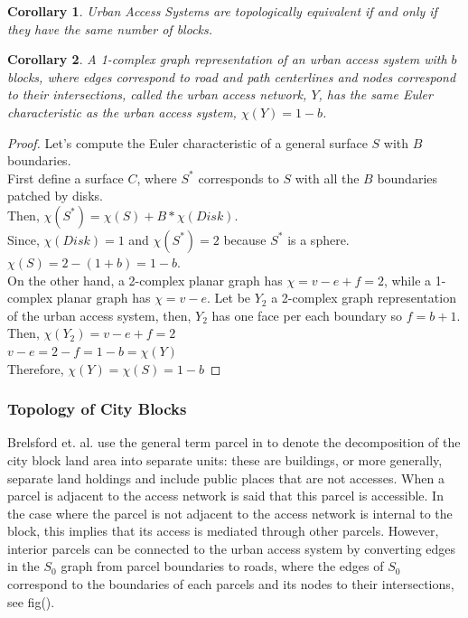\documentclass[10pt]{article}
\newtheorem{corollary}{Corollary}[theorem]
\begin{document}
\begin{corollary}
    Urban Access Systems are topologically equivalent if and only if they have the same number of blocks. 
\end{corollary}

\begin{corollary}
    A 1-complex graph representation of an urban access system with $b$ blocks, where edges correspond to road and path centerlines and nodes correspond to their intersections, called the urban access network, $Y$, has the same Euler characteristic as the urban access system, $\chi(Y)=1-b$. 
\end{corollary}
\begin{proof}
	Let's compute the Euler characteristic of a general surface $S$ with $B$ boundaries.\\
	
	First define a surface $C$, where $S^*$ corresponds to $S$ with all the $B$ boundaries patched by disks.\\
	
	Then,	$\chi(S^*)=\chi(S)+B*\chi(Disk)$.\\
	Since, $\chi(Disk)=1$ and $\chi(S^*)=2$ because $S^*$ is a sphere.\\
	
	$\chi(S)=2-(1+b)=1-b$.\\
	
	On the other hand, a 2-complex planar graph has $\chi=v-e+f=2$, while a 1-complex planar graph has $\chi=v-e$. Let be $Y_2$ a 2-complex graph representation of the urban access system, then, $Y_2$ has one face per each boundary so $f=b+1$.\\
	
	Then,	$\chi(Y_2)=v-e+f=2$\\
	$v-e=2-f=1-b=\chi(Y)$\\
	Therefore, $\chi(Y)=\chi(S)=1-b$
\end{proof}


\subsubsection{Topology of City Blocks}

Brelsford et. al. use the general term parcel in \cite{bre} to denote the decomposition of the city block land area into separate units: these are buildings, or more generally, separate land holdings and include public places that are not accesses. When a parcel is adjacent to the access network is said that this parcel is accessible. In the case where the parcel is not adjacent to the access network is internal to the block, this implies that its access is mediated through other parcels. However, interior parcels can be connected to the urban access system by converting edges in the $S_0$ graph from parcel boundaries to roads, where the edges of $S_0$ correspond to the boundaries of each parcels and its nodes to their intersections, see fig().\\
\end{document}
